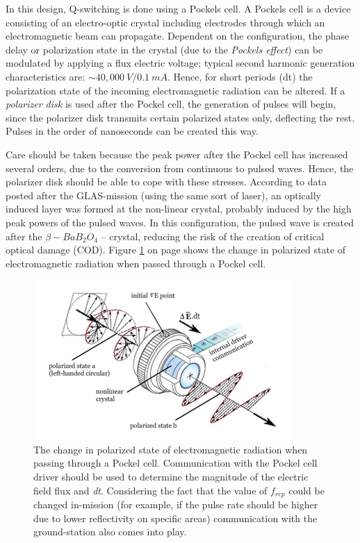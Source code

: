 In this design, Q-switching is done using a Pockels cell. A Pockels cell is a device consisting of an electro-optic crystal including electrodes through which an electromagnetic beam can propagate. Dependent on the configuration, the phase delay or polarization state in the crystal (due to the \textit{Pockels effect}) can be modulated by applying a flux electric voltage; typical second harmonic generation characteristics are: $\sim40,000\ V / 0.1\ mA$.  Hence, for short periods (dt) the polarization state of the incoming electromagnetic radiation can be altered. If a \textit{polarizer disk} is used after the Pockel cell, the generation of pulses will begin, since the polarizer disk transmits certain polarized states only, deflecting the rest. Pulses in the order of nanoseconds can be created this way.

Care should be taken because the peak power after the Pockel cell has increased several orders, due to the conversion from continuous to pulsed waves. Hence, the polarizer disk should be able to cope with these stresses. According to data posted after the GLAS-mission (using the same sort of \acs{laser}), an optically induced layer was formed at the non-linear crystal, probably induced by the high peak powers of the pulsed waves. In this configuration, the pulsed wave is created after the $\beta-BaB_{2}O_{4}$ -- crystal, reducing the risk of the creation of critical optical damage (COD). Figure \ref{fig:pockel_cell} on page \pageref{fig:pockel_cell} shows the change in polarized state of electromagnetic radiation when passed through a Pockel cell.

\begin{figure} [ht]
\centering
\includegraphics[scale=1.2]{chapters/img/laser_polarized.png}	
\caption[Polarized state passed through a Pockel cell]{The change in polarized state of electromagnetic radiation when passing through a Pockel cell. Communication with the Pockel cell driver should be used to determine the magnitude of the electric field flux and \textit{dt}. Considering the fact that the value of $f_{rep}$ could be changed in-mission (for example, if the pulse rate should be higher due to lower reflectivity on specific areas) communication with the ground-station also comes into play.}
\label{fig:pockel_cell}
\end{figure}

